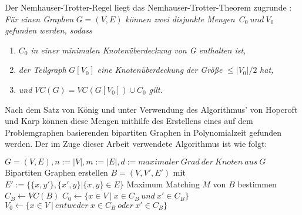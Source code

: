 Der Nemhauser-Trotter-Regel liegt das Nemhauser-Trotter-Theorem zugrunde \cite{trott}:
\textit{Für einen Graphen} $G=(V,E)$ \textit{können zwei disjunkte Mengen}\ $C_{0}\ und\ V_{0}$ \textit{gefunden werden, sodass}
\begin{enumerate}
\item $C_{0}$ \textit{ in einer minimalen Knotenüberdeckung von G enthalten ist,}
\item \textit{der Teilgraph }$G[V_{0}]$ \textit{eine Knotenüberdeckung} \textit{der Größe} $\leq |V_{0}| / 2$ \textit{ hat,}
\item \textit{und} $VC(G) = VC(G[V_{0}])\cup C_{0}$ \textit{ gilt.}
\end{enumerate}
Nach dem Satz von König und unter Verwendung des Algorithmus' von Hopcroft und Karp \cite{paper:6} können diese Mengen mithilfe des Erstellens eines auf dem Problemgraphen basierenden bipartiten Graphen in Polynomialzeit gefunden werden. Der im Zuge dieser Arbeit verwendete Algorithmus ist wie folgt:

\begin{algorithm}[caption={Nemhauser-Trotter-Regel.}, label={alg1}]
$G = (V, E), n:= |V|, m:=|E|, d:= maximaler\ Grad\ der\ Knoten\ aus\ G$
Bipartiten Graphen erstellen $B = (V, V', E')$ 
  mit $E':= \{\{x,y'\}, \{x', y\} | \{x,y\} \in E\}$ 
Maximum Matching $M$ von $B$ bestimmen 
$C_{B} \leftarrow VC(B)$ 
$C_{0} \leftarrow \{x \in V\ |\ x \in C_{B}\ und\ x' \in C_{B} \}$ 
$V_{0} \leftarrow \{x \in V\ |\ entweder\ x \in C_{B}\ oder\ x' \in C_{B} \}$ 
\end{algorithm}

